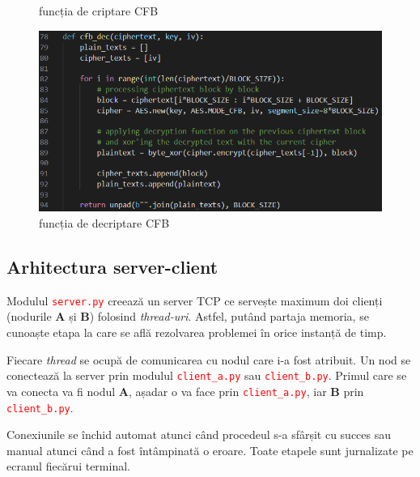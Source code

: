 \documentclass{article}
\begin{document}
\begin{center}
\begin{figure}[h!]
\caption{funcția de criptare CFB}
\end{figure}
\begin{figure}[h!]
\includegraphics[scale=0.7]{4.jpg}
\caption{funcția de decriptare CFB}
\end{figure}
\end{center}
\newpage

\subsection{Arhitectura server-client}
Modulul \textcolor{red}{\lstinline{server.py}} creează un server TCP ce servește maximum doi clienți (nodurile \textbf{A} și \textbf{B}) folosind \emph{thread-uri}. Astfel, putând partaja memoria, se cunoaște etapa la care se află rezolvarea problemei în orice instanță de timp.\par
Fiecare \emph{thread} se ocupă de comunicarea cu nodul care i-a fost atribuit. Un nod se conectează la server prin modulul \textcolor{red}{\lstinline{client_a.py}} sau \textcolor{red}{\lstinline{client_b.py}}. Primul care se va conecta va fi nodul \textbf{A}, așadar o va face prin \textcolor{red}{\lstinline{client_a.py}}, iar \textbf{B} prin \textcolor{red}{\lstinline{client_b.py}}.\par
Conexiunile se închid automat atunci când procedeul s-a sfârșit cu succes sau manual atunci când a fost întâmpinată o eroare. Toate etapele sunt jurnalizate pe ecranul fiecărui terminal.\par
\end{document}
